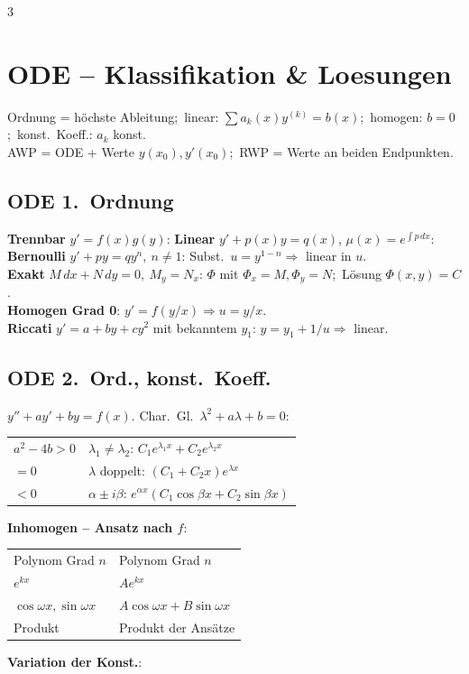 \documentclass[8pt,a4paper]{extarticle}
\begin{document}
\begin{multicols*}{3}
\section{ODE -- Klassifikation \& Loesungen}
Ordnung = h\"ochste Ableitung;\ linear: $\sum a_k(x)y^{(k)}=b(x)$;\ homogen: $b{=}0$;\ konst.\ Koeff.: $a_k$ konst.\\
AWP = ODE + Werte $y(x_0),y'(x_0)$;\ RWP = Werte an beiden Endpunkten.

\subsection{ODE 1.\ Ordnung}
\textbf{Trennbar} $y'=f(x)g(y)$:
\textbf{Linear} $y'+p(x)y=q(x)$, $\mu(x)=e^{\int p\,dx}$:
\textbf{Bernoulli} $y'+py=qy^n,\ n\!\ne\!1$: Subst.\ $u=y^{1-n}\Rightarrow$ linear in $u$.\\
\textbf{Exakt} $M\,dx+N\,dy=0,\ M_y=N_x$: $\Phi$ mit $\Phi_x{=}M,\Phi_y{=}N$;\ L\"osung $\Phi(x,y)=C$.\\
\textbf{Homogen Grad 0}: $y'=f(y/x)\Rightarrow u{=}y/x$.\\
\textbf{Riccati} $y'=a+by+cy^2$ mit bekanntem $y_1$: $y=y_1+1/u\Rightarrow$ linear.

\subsection{ODE 2.\ Ord., konst.\ Koeff.}
$y''+ay'+by=f(x)$. Char.\ Gl.\ $\lambda^2+a\lambda+b=0$:
\begin{tabularx}{\linewidth}{@{}l@{\ }X@{}}
$a^2{-}4b>0$ & $\lambda_1\!\ne\!\lambda_2$: $C_1 e^{\lambda_1 x}{+}C_2 e^{\lambda_2 x}$ \\
$=0$ & $\lambda$ doppelt: $(C_1{+}C_2 x)e^{\lambda x}$ \\
$<0$ & $\alpha{\pm}i\beta$: $e^{\alpha x}(C_1\!\cos\!\beta x{+}C_2\!\sin\!\beta x)$ \\
\end{tabularx}
\textbf{Inhomogen -- Ansatz nach $f$}:
\begin{tabularx}{\linewidth}{@{}l@{\ }X@{}}
Polynom Grad $n$ & Polynom Grad $n$ \\
$e^{kx}$ & $A e^{kx}$ \\
$\cos\omega x,\sin\omega x$ & $A\cos\omega x+B\sin\omega x$ \\
Produkt & Produkt der Ans\"atze \\
\end{tabularx}
\textbf{Variation der Konst.}:


\end{multicols*}
\end{document}
